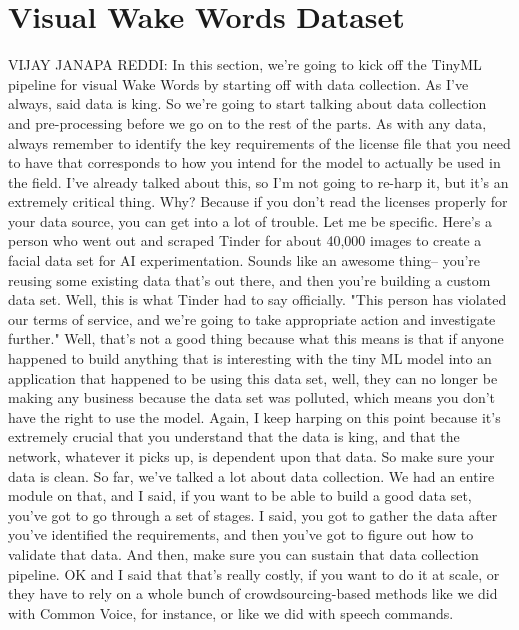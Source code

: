   \section{Visual Wake Words Dataset}
  
  VIJAY JANAPA REDDI: In this section, we're
  going to kick off the TinyML pipeline for visual Wake Words
  by starting off with data collection.
  As I've always, said data is king.
  So we're going to start talking about data collection
  and pre-processing before we go on to the rest of the parts.
  As with any data, always remember to identify the key requirements
  of the license file that you need to have
  that corresponds to how you intend for the model
  to actually be used in the field.
  I've already talked about this, so I'm not going to re-harp it,
  but it's an extremely critical thing.
  Why?
  Because if you don't read the licenses properly for your data source,
  you can get into a lot of trouble.
  Let me be specific.
  Here's a person who went out and scraped Tinder for about 40,000 images
  to create a facial data set for AI experimentation.
  Sounds like an awesome thing-- you're reusing
  some existing data that's out there, and then you're building a custom data set.
  Well, this is what Tinder had to say officially.
  "This person has violated our terms of service,
  and we're going to take appropriate action and investigate further."
  Well, that's not a good thing because what
  this means is that if anyone happened to build anything that
  is interesting with the tiny ML model into an application that happened
  to be using this data set, well, they can no longer be making
  any business because the data set was polluted, which means you
  don't have the right to use the model.
  Again, I keep harping on this point because it's extremely crucial that you
  understand that the data is king, and that the network, whatever it picks up,
  is dependent upon that data.
  So make sure your data is clean.
  So far, we've talked a lot about data collection.
  We had an entire module on that, and I said,
  if you want to be able to build a good data set,
  you've got to go through a set of stages.
  I said, you got to gather the data after you've identified the requirements,
  and then you've got to figure out how to validate that data.
  And then, make sure you can sustain that data collection pipeline.
  OK and I said that that's really costly, if you want to do it at scale,
  or they have to rely on a whole bunch of crowdsourcing-based methods
  like we did with Common Voice, for instance,
  or like we did with speech commands.
